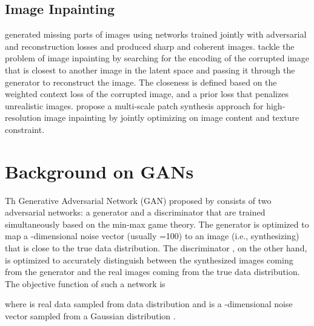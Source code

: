 \documentclass[times,twocolumn,final,authoryear]{elsarticle_modified}
\begin{document}
\vspace{-5pt}

\subsection{Image Inpainting}
\cite{pathak2016context} generated missing parts of images using networks trained jointly with adversarial and reconstruction losses and produced sharp and coherent images. \cite{yeh2017semantic} tackle the problem of image inpainting by searching for the encoding of the corrupted image that is closest to another image in the latent space and passing it through the generator to reconstruct the image. The closeness is defined based on the weighted context loss of the corrupted image, and a prior loss that penalizes unrealistic images. \cite{yang2017high} propose a multi-scale patch synthesis approach for high-resolution image inpainting by jointly optimizing on image content and texture constraint.

















 \vspace{-5pt}
\section{Background on GANs}
\label{sec:background}
Th Generative Adversarial Network (GAN) proposed by \cite{goodfellow2014generative} consists of two adversarial networks: a generator and a discriminator that are trained simultaneously based on the min-max game theory. The generator  is optimized to map a -dimensional noise vector (usually =100) to an image (i.e., synthesizing) that is close to the true data distribution. The discriminator , on the other hand, is optimized to accurately distinguish between the synthesized images coming from the generator and the real images coming from the true data distribution. The objective function of such a network is 
\vspace{-15pt}



\noindent where  is real data sampled from data distribution  and  is a -dimensional noise vector sampled from a Gaussian distribution . 
\end{document}
